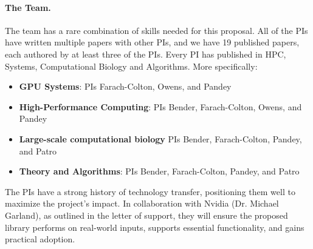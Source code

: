 
\paragraph{The Team.}
The team has a rare combination of skills needed for this proposal.    All of the PIs have written multiple papers with other PIs, and we have 19 published papers, each authored by at least three  of the PIs.
 Every PI has published in HPC, Systems, Computational Biology and Algorithms.  More specifically:


\begin{itemize}%
    \item \textbf{GPU Systems}: PIs Farach-Colton, Owens, and Pandey

    \item \textbf{High-Performance Computing}: PIs Bender, Farach-Colton, Owens, and Pandey

    \item \textbf{Large-scale computational biology} PIs Bender, Farach-Colton, Pandey, and Patro

        \item \textbf{Theory and Algorithms}: PIs Bender, Farach-Colton, Pandey, and Patro
    

\end{itemize}

The PIs have a strong history of technology transfer, positioning them well to maximize the project's impact. In collaboration with Nvidia (Dr. Michael Garland), as outlined in the letter of support, they will ensure the proposed library performs on real-world inputs, supports essential functionality, and gains practical adoption.

